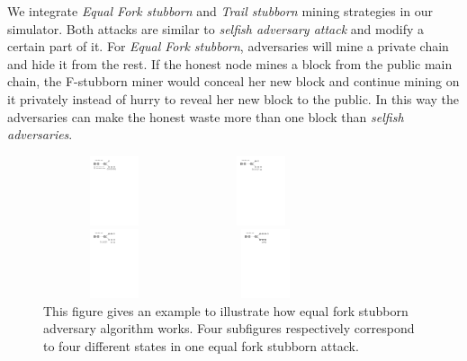 \documentclass{llncs}
\begin{document}
We integrate \emph{Equal Fork stubborn} and \emph{Trail stubborn} mining strategies in our simulator. Both attacks are similar to \emph{selfish adversary attack} and modify a certain part of it. For \emph{Equal Fork stubborn}, adversaries will mine a private chain and hide it from the rest. If the honest node mines a block from the public main chain, the F-stubborn miner would conceal her new block and continue mining on it privately instead of hurry to reveal her new block to the public. In this way the adversaries can make the honest waste more than one block than \emph{selfish adversaries}.
\vspace{-7mm}
\begin{figure}[!htbp]
\begin{minipage}[t]{0.5\linewidth}
\centering
\includegraphics[height=0.8in, width=1.65in]{Figures/Stubborn-1.pdf}

\end{minipage}%
\begin{minipage}[t]{0.5\linewidth}
\centering
\includegraphics[height=0.8in, width=1.65in]{Figures/Stubborn-2.pdf}

\end{minipage}

\begin{minipage}[t]{0.5\linewidth}
\centering
\includegraphics[height=0.8in, width=1.65in]{Figures/Stubborn-3.pdf}

\end{minipage}%
\begin{minipage}[t]{0.5\linewidth}
\centering
\includegraphics[height=0.8in, width=1.75in]{Figures/Stubborn-4.pdf}

\end{minipage}
\vspace{0mm}
\setlength{\belowcaptionskip}{-10pt}
\caption{This figure gives an example to illustrate how equal fork stubborn adversary algorithm works. Four subfigures respectively correspond to four different states in one equal fork stubborn attack.}
\label{equal}
\vspace{-3mm}
\end{figure}
\end{document}
